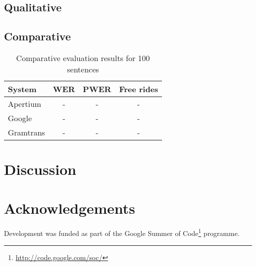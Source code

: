 \documentclass[11pt]{article}
\begin{document}
\subsection{Qualitative}


\subsection{Comparative}


\begin{table}
\centering
\begin{tabular}{|l|c|c|c|}
\hline
System & WER & PWER & Free rides\\
\hline
Apertium  & -   & -    & -\\
Google    & -   & -    & -\\
Gramtrans & -   & -    & -\\
\hline
\end{tabular}
    \caption{Comparative evaluation results for 100 sentences}
    \label{table:compeval}
\end{table}

\section{Discussion}


\cite{hagen2000cbt}

\section*{Acknowledgements}

Development was funded as part of the Google Summer of Code\footnote{\url{http://code.google.com/soc/}} programme.



\end{document}

